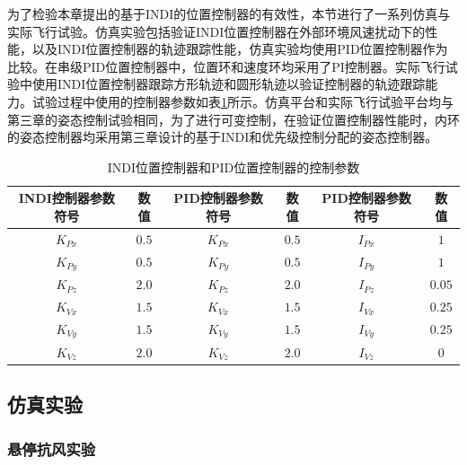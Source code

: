 为了检验本章提出的基于INDI的位置控制器的有效性，本节进行了一系列仿真与实际飞行试验。仿真实验包括验证INDI位置控制器在外部环境风速扰动下的性能，以及INDI位置控制器的轨迹跟踪性能，仿真实验均使用PID位置控制器作为比较。在串级PID位置控制器中，位置环和速度环均采用了PI控制器。实际飞行试验中使用INDI位置控制器跟踪方形轨迹和圆形轨迹以验证控制器的轨迹跟踪能力。试验过程中使用的控制器参数如表\ref{outloop_Control_parameters}所示。仿真平台和实际飞行试验平台均与第三章的姿态控制试验相同，为了进行可变控制，在验证位置控制器性能时，内环的姿态控制器均采用第三章设计的基于INDI和优先级控制分配的姿态控制器。
\begin{table}
	\caption{\label{outloop_Control_parameters}INDI位置控制器和PID位置控制器的控制参数}
	\centering
	\small 
	\begin{tabular}{cccccc}
		\hline 
		INDI控制器参数符号 & 数值 & PID控制器参数符号 & 数值 & PID控制器参数符号 & 数值 \tabularnewline
		\hline 
		$K_{Px}$ & $0.5$ & $K_{Px}$ & $0.5$& $I_{Px}$  & $1$ \tabularnewline
		$K_{Py}$ & $0.5$ & $K_{Py}$ & $0.5$& $I_{Py}$  & $1$ \tabularnewline
        $K_{Pz}$ & $2.0$ & $K_{Pz}$ & $2.0$& $I_{Pz}$  & $0.05$ \tabularnewline
        $K_{Vx}$ & $1.5$ & $K_{Vx}$ & $1.5$& $I_{Vx}$  & $0.25$ \tabularnewline
        $K_{Vy}$ & $1.5$ & $K_{Vy}$ & $1.5$& $I_{Vy}$  & $0.25$ \tabularnewline
        $K_{Vz}$ & $2.0$ & $K_{Vz}$ & $2.0$& $I_{Vz}$  & $0$ \tabularnewline
		\hline 
	\end{tabular}
\end{table}

\subsection{仿真实验}

\subsubsection{悬停抗风实验}

